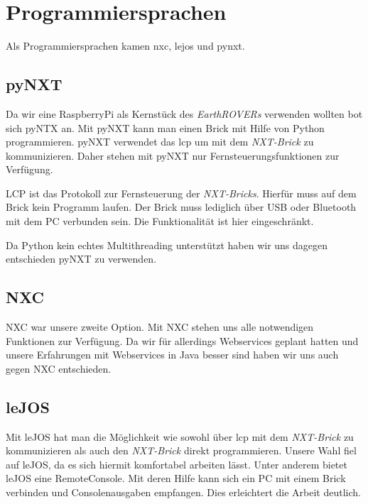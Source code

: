 \chapter{Programmiersprachen}
Als Programmiersprachen kamen \gls{nxc}, \gls{lejos} und \gls{pynxt}. 

\section{pyNXT}
Da wir eine RaspberryPi als Kernstück des \textit{EarthROVERs} verwenden wollten bot sich pyNTX an. Mit pyNXT kann man einen Brick mit Hilfe von Python programmieren. pyNXT verwendet das \gls{lcp} um mit dem \textit{NXT-Brick} zu kommunizieren. Daher stehen mit pyNXT nur Fernsteuerungsfunktionen zur Verfügung.

LCP ist das Protokoll zur Fernsteuerung der \textit{NXT-Bricks}. Hierfür muss auf dem Brick kein Programm laufen. Der Brick muss lediglich über USB oder Bluetooth mit dem PC verbunden sein. Die Funktionalität ist hier eingeschränkt.

Da Python kein echtes Multithreading unterstützt haben wir uns dagegen entschieden pyNXT zu verwenden.

\section{NXC}
NXC war unsere zweite Option. Mit NXC stehen uns alle notwendigen Funktionen zur Verfügung. Da wir für allerdings Webservices geplant hatten und unsere Erfahrungen mit Webservices in Java besser sind haben wir uns auch gegen NXC entschieden.

\section{leJOS}
Mit leJOS hat man die Möglichkeit wie sowohl über \gls{lcp} mit dem \textit{NXT-Brick} zu kommunizieren als auch den \textit{NXT-Brick} direkt programmieren. Unsere Wahl fiel auf leJOS, da es sich hiermit komfortabel arbeiten lässt. Unter anderem bietet leJOS eine RemoteConsole. Mit deren Hilfe kann sich ein PC mit einem Brick verbinden und Consolenausgaben empfangen. Dies erleichtert die Arbeit deutlich.
